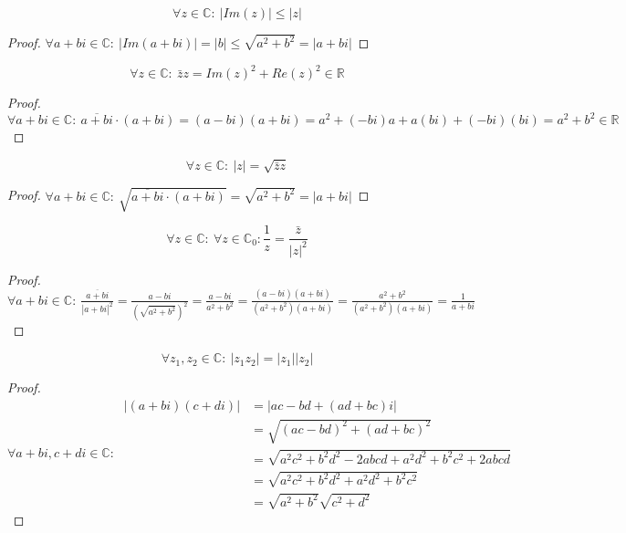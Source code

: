 \documentclass[main.tex]{subfiles}
\begin{document}
\begin{pr}
  \label{pr:imaginair-deel-kleiner}
  \[ \forall z\in \mathbb{C}:\ |Im(z)| \le |z|\]

  \begin{proof}
    $\forall a+bi\in \mathbb{C}:\  |Im(a+bi)| = |b| \le \sqrt{a^{2}+b^{2}} = |a+bi|$ 
  \end{proof}
\end{pr}

\begin{pr}
  \label{pr:normaal-maal-toegevoegde-in-r}
  \[ \forall z\in \mathbb{C}:\ \bar{z}z = Im(z)^{2}+Re(z)^{2} \in \mathbb{R} \]

  \begin{proof}
    $\forall a+bi\in \mathbb{C}:\  \overline{a+bi}\cdot(a+bi) = (a-bi)(a+bi) = a^{2} + (-bi)a + a(bi) + (-bi)(bi) = a^{2} + b^{2} \in \mathbb{R}$
  \end{proof}
\end{pr}

\begin{pr}
  \label{pr:modulus-in-termen-van-toegevoegde}
  \[ \forall z\in \mathbb{C}:\ |z| = \sqrt{\bar{z}z} \]

  \begin{proof}
    $\forall a+bi\in \mathbb{C}:\ \sqrt{\overline{a+bi}\cdot(a+bi)} = \sqrt{a^{2}+b^{2}} = |a+bi|$
  \end{proof}
\end{pr}

\begin{pr}
  \[ \forall z\in \mathbb{C}:\ \forall z \in \mathbb{C}_{0}: \frac{1}{z} = \frac{\bar{z}}{|z|^{2}} \]

  \begin{proof}
    $\forall a+bi\in \mathbb{C}:\ \frac{\overline{a+bi}}{|a+bi|^{2}} = \frac{a-bi}{\left(\sqrt{a^{2}+b^{2}}\right)^{2}} = \frac{a-bi}{a^{2}+b^{2}}= \frac{(a-bi)(a+bi)}{(a^{2}+b^{2})(a+bi)} = \frac{a^{2}+b^{2}}{(a^{2}+b^{2})(a+bi)} = \frac{1}{a+bi}$
  \end{proof}
\end{pr}

\begin{pr}
  \[ \forall z_{1},z_{2}\in \mathbb{C}:\ |z_{1}z_{2}| = |z_{1}||z_{2}| \]

  \begin{proof}
    \[
    \forall a+bi,c+di \in \mathbb{C}:\
    \begin{array}{rll}
      |(a+bi)(c+di)| &= |ac-bd + (ad+bc)i|\\
      &= \sqrt{(ac-bd)^{2} + (ad+bc)^{2}}\\
      &= \sqrt{a^{2}c^{2} +b^{2}d^{2}-2abcd + a^{2}d^{2} + b^{2}c^{2} +2abcd}\\
      &= \sqrt{a^{2}c^{2} +b^{2}d^{2} + a^{2}d^{2} + b^{2}c^{2}}\\
      &= \sqrt{a^{2}+b^{2}}\sqrt{c^{2}+d^{2}}
    \end{array}
    \]
  \end{proof}
\end{pr}
\end{document}
